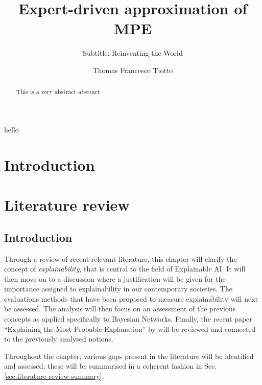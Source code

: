 \documentclass[mscthesis]{usiinfthesis}
\title{Expert-driven approximation of MPE} %
\subtitle{Subtitle: Reinventing the World} %
\author{Thomas Francesco Tiotto} %
\begin{document}
\maketitle %

\frontmatter %

\begin{abstract}
This is a very abstract abstract. 

\end{abstract}

\begin{acknowledgements}
hello
\end{acknowledgements}

\tableofcontents 
\listoffigures %
\listoftables %

\mainmatter

\chapter{Introduction}\label{chap:introduction}




 
\chapter{Literature review}\label{chap:literature-review}

\section{Introduction}
Through a review of recent relevant literature, this chapter will clarify the concept of \textit{explainability}, that is central to the field of Explainable AI.
It will then move on to a discussion where a justification will be given for the importance assigned to explainability in our contemporary societies.
The evaluations methods that have been proposed to measure explainability will next be assessed.
The analysis will then focus on an assessment of the previous concepts as applied specifically to Bayesian Networks.
Finally, the recent paper \enquote{Explaining the Most Probable Explanation} by \cite{Butz2018} will be reviewed and connected to the previously analysed notions.

Throughout the chapter, various gaps present in the literature will be identified and assessed; these will be summarised in a coherent fashion in Sec. \ref{sec:literature-review-summary}.
\end{document}

